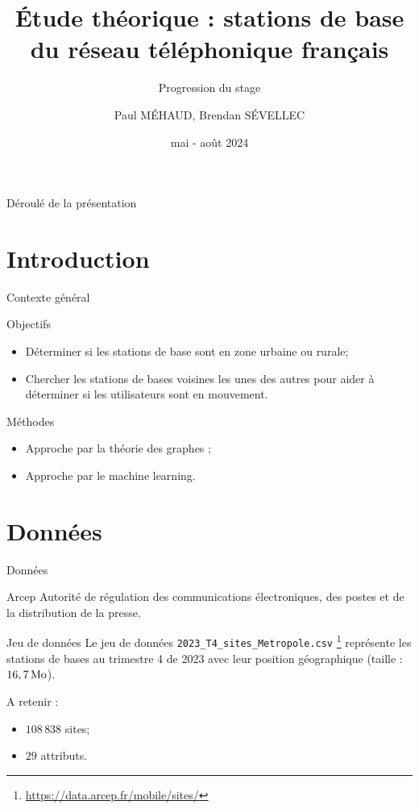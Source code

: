 \documentclass[french, 9pt,xcolor={table,dvipsnames},t,aspectratio=169,onlytextwidth,mathserif]{beamer}
\title[Stage ČVUT]{Étude théorique : stations de base du réseau téléphonique français}
\subtitle{Progression du stage}
\author{Paul MÉHAUD, Brendan SÉVELLEC}
\institute{České Vysoké Učení Technické v Praze}
\date{mai - août 2024}
\begin{document}
\begin{frame}
  \titlepage
\end{frame}


\begin{frame}{Déroulé de la présentation}
    \tableofcontents
\end{frame}


\section{Introduction}
\insertsectionframe


\begin{frame}{Contexte général}

    \begin{alertblock}{Objectifs}
        \begin{itemize}
            \item Déterminer si les stations de base sont en zone urbaine ou rurale;
            \item Chercher les stations de bases voisines les unes des autres pour aider à déterminer si les utilisateurs sont en mouvement.
        \end{itemize}
    \end{alertblock}

    \begin{block}{Méthodes}
        \begin{itemize}
            \item Approche par la théorie des graphes ;
            \item Approche par le machine learning.
        \end{itemize}
    \end{block}
\end{frame}


\section{Données}
\insertsectionframe

\begin{frame}{Données}
    \begin{block}{Arcep}
        Autorité de régulation des communications électroniques, des postes et de la distribution de la presse.
    \end{block}

    \begin{block}{Jeu de données}
        Le jeu de données \texttt{2023\_T4\_sites\_Metropole.csv} \footnote{\url{https://data.arcep.fr/mobile/sites/}} représente les stations de bases au trimestre 4 de 2023 avec leur position géographique (taille : $\unit[16,7]{Mo}$).
    \end{block}

    A retenir :
    \begin{itemize}
        \item $108\,838$ sites;
        \item $29$ attributs.
    \end{itemize}
\end{frame}
\end{document}
